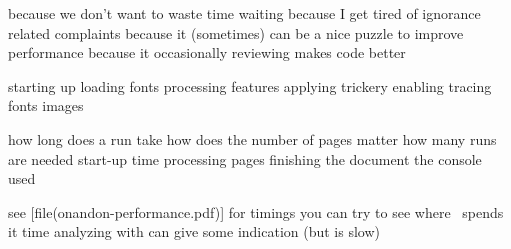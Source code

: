 
\definecolor[maincolor][g=.4,b=.4]

\startdocument[title=Performance,subtitle={\CONTEXT\ 2017 Maibach}]

\startchapter[title=Why bother]

\startitemize
    \startitem because we don't want to waste time waiting \stopitem
    \startitem because I get tired of ignorance related complaints \stopitem
    \startitem because it (sometimes) can be a nice puzzle to improve performance \stopitem
    \startitem because it occasionally reviewing makes code better \stopitem
\stopitemize

\stopchapter

\startchapter[title=Possible bottlenecks]

\startitemize
    \startitem starting up \stopitem
    \startitem loading fonts \stopitem
    \startitem processing features \stopitem
    \startitem applying trickery \stopitem
    \startitem enabling tracing \stopitem
    \blank[2*big]
    \startitem fonts \stopitem
    \startitem \LUA \stopitem
    \startitem images \stopitem
\stopitemize

\stopchapter

\startchapter[title=Measurements]

\startitemize
    \startitem how long does a run take \stopitem
    \startitem how does the number of pages matter \stopitem
    \startitem how many runs are needed \stopitem
    \blank[2*big]
    \startitem start-up time \stopitem
    \startitem processing pages \stopitem
    \startitem finishing the document \stopitem
    \startitem the console used \stopitem
\stopitemize

\stopchapter

\startchapter[title=Examples]

\startitemize
\startitem
    see [file(onandon-performance.pdf)] for timings
\stopitem
\startitem
    you can try  to see where \LUA\ spends it time
\stopitem
\startitem
    analyzing with  can give some indication (but is slow)
\stopitem
\stopitemize

\stopchapter

\stopdocument

